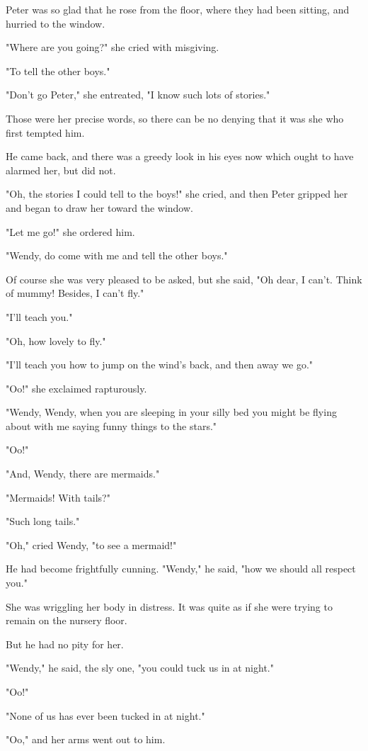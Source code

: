 Peter was so glad that he rose from the floor, where they had been
sitting, and hurried to the window.


"Where are you going?" she cried with misgiving.


"To tell the other boys."


"Don't go Peter," she entreated, "I know such lots of stories."


Those were her precise words, so there can be no denying that it was she
who first tempted him.


He came back, and there was a greedy look in his eyes now which ought to
have alarmed her, but did not.


"Oh, the stories I could tell to the boys!" she cried, and then Peter
gripped her and began to draw her toward the window.


"Let me go!" she ordered him.


"Wendy, do come with me and tell the other boys."


Of course she was very pleased to be asked, but she said, "Oh dear, I
can't. Think of mummy! Besides, I can't fly."


"I'll teach you."


"Oh, how lovely to fly."


"I'll teach you how to jump on the wind's back, and then away we go."


"Oo!" she exclaimed rapturously.


"Wendy, Wendy, when you are sleeping in your silly bed you might be flying
about with me saying funny things to the stars."


"Oo!"


"And, Wendy, there are mermaids."


"Mermaids! With tails?"


"Such long tails."


"Oh," cried Wendy, "to see a mermaid!"


He had become frightfully cunning. "Wendy," he said, "how we should all
respect you."


She was wriggling her body in distress. It was quite as if she were trying
to remain on the nursery floor.


But he had no pity for her.


"Wendy," he said, the sly one, "you could tuck us in at night."


"Oo!"


"None of us has ever been tucked in at night."


"Oo," and her arms went out to him.


